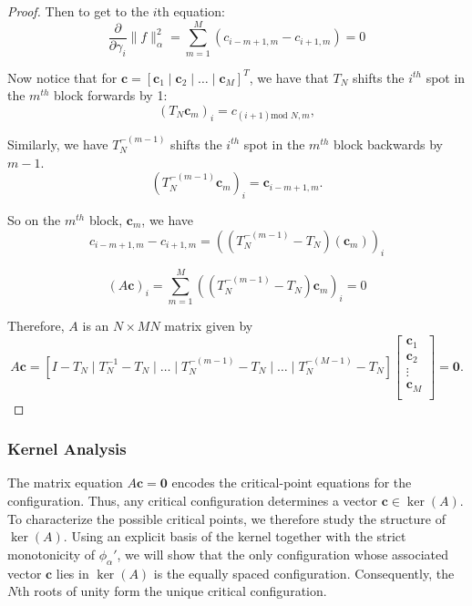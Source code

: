 \documentclass{article}
\begin{document}
\begin{proof}
Then to get to the $i$th equation:
$$\frac{\partial}{\partial \gamma_i}\|f\|_\alpha^2=\sum_{m=1}^M (c_{i-m+1,m} - c_{i+1,m}) = 0$$

Now notice that for $\mathbf{c}=[\mathbf{c}_1 \mid \mathbf{c}_2 \mid \dots \mid \mathbf{c}_M]^T$, 
 we have that $T_N$ shifts the $i^{th}$ spot in the $m^{th}$ block  forwards by 1:
$$\left(T_N \mathbf{c}_{m}\right)_i = c_{(i+1) \text{mod } N,m},$$

 Similarly, we have $T_N^{-(m-1)}$ shifts  the $i^{th}$ spot in the $m^{th}$ block  backwards by $m-1$.
$$\left (T_N^{-(m-1)}\mathbf{c}_m \right )_i = \mathbf{c}_{i-m+1,m}.$$

So on the $m^{th}$ block, $\mathbf{c}_m$, we have 
$$c_{i-m+1,m} - c_{i+1,m}= \left(\left( T_N^{-(m-1)}-T_N \right )\left (\mathbf{c}_m\right )\right)_i$$

$$(A\mathbf{c})_i=\sum_{m=1}^M \left((T_N^{-(m-1)}-T_N)\mathbf{c}_m \right)_i= 0$$

Therefore, $A$ is an $N\times MN$ matrix given by
$$A\mathbf{c}= \left[I - T_N \mid T_N^{-1} - T_N \mid \dots \mid T_N^{-(m-1)} - T_N \mid \dots \mid T_N^{-(M-1)} - T_N \right] \begin{bmatrix} \mathbf{c}_1\\ \mathbf{c}_2\\ \vdots\\ \mathbf{c}_M\\ \end{bmatrix}=\mathbf{0}.$$
\end{proof}


\subsubsection{Kernel Analysis}

The matrix equation $A\mathbf{c}=\mathbf{0}$ encodes the critical-point equations for the configuration. Thus, any critical configuration determines a vector $\mathbf{c}\in\ker(A)$. To characterize the possible critical points, we therefore study the structure of $\ker(A)$. Using an explicit basis of the kernel together with the strict monotonicity of $\phi_\alpha'$, we will show that the only configuration whose associated vector $\mathbf{c}$ lies in $\ker(A)$ is the equally spaced configuration. Consequently, the $N$th roots of unity form the unique critical configuration. 
\end{document}
